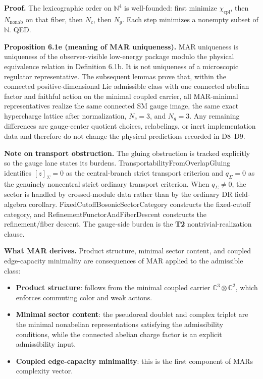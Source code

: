 \textbf{Proof.} The lexicographic order on \(\mathbb N^4\) is well-founded: first minimize \(\chi_{\mathrm{cpl}}\), then \(N_{\mathrm{nonab}}\) on that fiber, then \(N_c\), then \(N_g\). Each step minimizes a nonempty subset of \(\mathbb N\). QED.

\textbf{Proposition 6.1e (meaning of MAR uniqueness).} MAR uniqueness is uniqueness of the observer-visible low-energy package modulo the physical equivalence relation in Definition 6.1b. It is not uniqueness of a microscopic regulator representative. The subsequent lemmas prove that, within the connected positive-dimensional Lie admissible class with one connected abelian factor and faithful action on the minimal coupled carrier, all MAR-minimal representatives realize the same connected SM gauge image, the same exact hypercharge lattice after normalization, \(N_c=3\), and \(N_g=3\). Any remaining differences are gauge-center quotient choices, relabelings, or inert implementation data and therefore do not change the physical predictions recorded in D8--D9.

\textbf{Note on transport obstruction.} The gluing obstruction is tracked explicitly so the gauge lane states its burdens. TransportabilityFromOverlapGluing identifies \([z]_\Sigma=0\) as the central-branch strict transport criterion and \(q_\Sigma=0\) as the genuinely noncentral strict ordinary transport criterion. When \(q_\Sigma\ne0\), the sector is handled by crossed-module data rather than by the ordinary DR field-algebra corollary. FixedCutoffBosonicSectorCategory constructs the fixed-cutoff category, and RefinementFunctorAndFiberDescent constructs the refinement/fiber descent. The gauge-side burden is the \textbf{T2} nontrivial-realization clause.

\textbf{What MAR derives.} Product structure, minimal sector content, and coupled edge-capacity minimality are consequences of MAR applied to the admissible class:

\begin{itemize}
\tightlist
\item
  \textbf{Product structure}: follows from the minimal coupled carrier \(\mathbb{C}^3 \otimes \mathbb{C}^2\), which enforces commuting color and weak actions.
\item
  \textbf{Minimal sector content}: the pseudoreal doublet and complex triplet are the minimal nonabelian representations satisfying the admissibility conditions, while the connected abelian charge factor is an explicit admissibility input.
\item
  \textbf{Coupled edge-capacity minimality}: this is the first component of MAR\textquotesingle s complexity vector.
\end{itemize}

